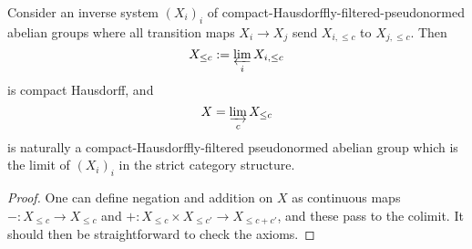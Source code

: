 \begin{proposition}
  \label{bounded-limits}
  \leanok
  Consider an inverse system $(X_i)_i$ of compact-Hausdorffly-filtered-pseudonormed abelian groups
  where all transition maps $X_i\to X_j$ send $X_{i,\leq c}$ to $X_{j,\leq c}$.
  Then
  \[ X_{\leq c} := \varprojlim_i X_{i,\leq c} \]
  is compact Hausdorff, and
  \[ X=\varinjlim_c X_{\leq c} \]
  is naturally a compact-Hausdorffly-filtered pseudonormed abelian group
  which is the limit of $(X_i)_i$ in the strict category structure.
\end{proposition}

\begin{proof}
  \leanok
  One can define negation and addition on $X$ as continuous maps
  $-: X_{\leq c}\to X_{\leq c}$ and $+: X_{\leq c}\times X_{\leq c'}\to X_{\leq c+c'}$, and these pass to the colimit.
  It should then be straightforward to check the axioms.
\end{proof}

